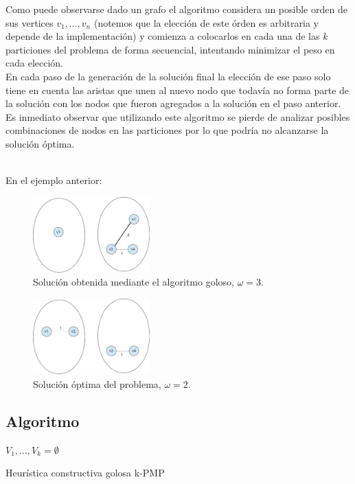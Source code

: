 Como puede observarse dado un grafo el algoritmo considera un posible orden de sus vertices $v_{1}, \ldots, v_{n}$ (notemos que la elecci\'on de este \'orden es
arbitraria y depende de la implementaci\'on) y comienza a colocarlos en cada una de las $k$ particiones del problema de forma secuencial, intentando
minimizar el peso en cada elecci\'on. \\
En cada paso de la generaci\'on de la soluci\'on final la elecci\'on de ese paso solo
tiene en cuenta las aristas que unen al nuevo nodo que todav\'ia no forma parte de la soluci\'on con los nodos que fueron agregados a la soluci\'on
en el paso anterior. Es inmediato observar que utilizando este algoritmo se pierde de analizar posibles combinaciones de nodos en las particiones por
lo que podr\'ia no alcanzarse la soluci\'on \'optima. \\\

En el ejemplo anterior:
\begin{figure}[h!]
  \centering
  \includegraphics[width=0.4\textwidth]{ej3/greedy_graph_partition_example3.png}
  \caption{Soluci\'on obtenida mediante el algoritmo goloso, $\omega = 3$.}
\end{figure}

\begin{figure}[h!]
  \centering
  \includegraphics[width=0.4\textwidth]{ej3/greedy_graph_partition_example4.png}
  \caption{Soluci\'on \'optima del problema, $\omega = 2$.}
\end{figure}



\subsection{Algoritmo}


\begin{algorithm}[H]
	$V_{1}, \ldots , V_{k} = \emptyset$\;
\caption{Heur\'istica constructiva golosa k-PMP\label{alg_ej3}}  
\end{algorithm} 

